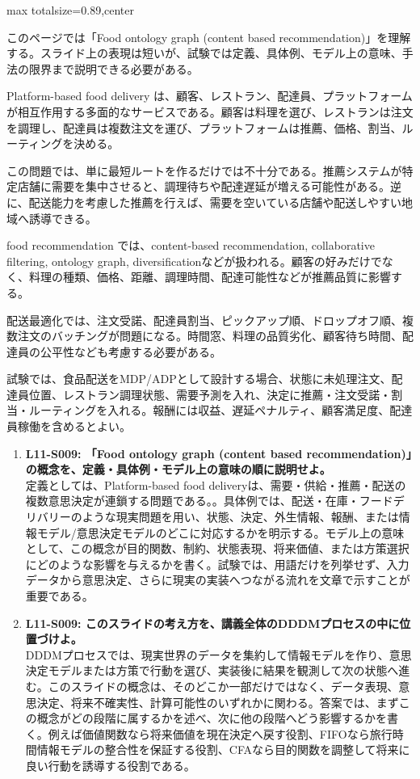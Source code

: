 \begin{minipage}[t]{0.58\textwidth}
\begin{adjustbox}{max totalsize={\textwidth}{0.89\textheight},center}
\begin{minipage}{\textwidth}\scriptsize
{}このページでは「Food ontology graph (content based recommendation)」を理解する。スライド上の表現は短いが、試験では定義、具体例、モデル上の意味、手法の限界まで説明できる必要がある。\par
Platform-based food delivery は、顧客、レストラン、配達員、プラットフォームが相互作用する多面的なサービスである。顧客は料理を選び、レストランは注文を調理し、配達員は複数注文を運び、プラットフォームは推薦、価格、割当、ルーティングを決める。\par
この問題では、単に最短ルートを作るだけでは不十分である。推薦システムが特定店舗に需要を集中させると、調理待ちや配達遅延が増える可能性がある。逆に、配送能力を考慮した推薦を行えば、需要を空いている店舗や配送しやすい地域へ誘導できる。\par
food recommendation では、content-based recommendation, collaborative filtering, ontology graph, diversificationなどが扱われる。顧客の好みだけでなく、料理の種類、価格、距離、調理時間、配達可能性などが推薦品質に影響する。\par
配送最適化では、注文受諾、配達員割当、ピックアップ順、ドロップオフ順、複数注文のバッチングが問題になる。時間窓、料理の品質劣化、顧客待ち時間、配達員の公平性なども考慮する必要がある。\par
試験では、食品配送をMDP/ADPとして設計する場合、状態に未処理注文、配達員位置、レストラン調理状態、需要予測を入れ、決定に推薦・注文受諾・割当・ルーティングを入れる。報酬には収益、遅延ペナルティ、顧客満足度、配達員稼働を含めるとよい。\par{}\begin{enumerate}\item \textbf{L11-S009: 「Food ontology graph (content based recommendation)」の概念を、定義・具体例・モデル上の意味の順に説明せよ。}\\定義としては、Platform-based food deliveryは、需要・供給・推薦・配送の複数意思決定が連鎖する問題である。。具体例では、配送・在庫・フードデリバリーのような現実問題を用い、状態、決定、外生情報、報酬、または情報モデル/意思決定モデルのどこに対応するかを明示する。モデル上の意味として、この概念が目的関数、制約、状態表現、将来価値、または方策選択にどのような影響を与えるかを書く。試験では、用語だけを列挙せず、入力データから意思決定、さらに現実の実装へつながる流れを文章で示すことが重要である。\item \textbf{L11-S009: このスライドの考え方を、講義全体のDDDMプロセスの中に位置づけよ。}\\DDDMプロセスでは、現実世界のデータを集約して情報モデルを作り、意思決定モデルまたは方策で行動を選び、実装後に結果を観測して次の状態へ進む。このスライドの概念は、そのどこか一部だけではなく、データ表現、意思決定、将来不確実性、計算可能性のいずれかに関わる。答案では、まずこの概念がどの段階に属するかを述べ、次に他の段階へどう影響するかを書く。例えば価値関数なら将来価値を現在決定へ戻す役割、FIFOなら旅行時間情報モデルの整合性を保証する役割、CFAなら目的関数を調整して将来に良い行動を誘導する役割である。\end{enumerate}

\end{minipage}
\end{adjustbox}
\end{minipage}
